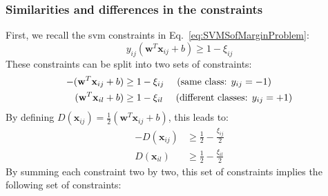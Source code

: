 \subsubsection{Similarities and differences in the constraints}
\noindent First, we recall the {\sc svm} constraints in Eq.~\ref{eq:SVMSofMarginProblem}:
\begin{equation*}
	y_{ij}(\textbf{w}^T\textbf{x}_{ij}+b) \geq 1-\xi_{ij} 
\end{equation*}
\noindent These constraints can be split into two sets of constraints:
\begin{equation*}
	\begin{aligned}
		-(\textbf{w}^T\textbf{x}_{ij}+b) & \geq 1-\xi_{ij} \text{ \quad (same class: $y_{ij}=-1$)} \\
		(\textbf{w}^T\textbf{x}_{il}+b) & \geq 1-\xi_{il} \text{ \quad  (different classes: $y_{ij}=+1$)}
	\end{aligned}
\end{equation*}
\noindent By defining $D(\textbf{x}_{ij})=\frac{1}{2}(\textbf{w}^T\textbf{x}_{ij}+b)$, this leads to:
\begin{equation*}
	\begin{aligned}
		-D(\textbf{x}_{ij}) & \geq \frac{1}{2}-\frac{\xi_{ij}}{2} \\
		D(\textbf{x}_{il}) & \geq \frac{1}{2}-\frac{\xi_{il}}{2}
	\end{aligned}
\end{equation*}  
\noindent By summing each constraint two by two, this set of constraints implies the following set of constraints: \\
 \\

